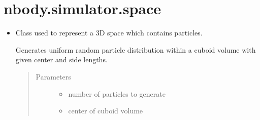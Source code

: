 \documentclass[letterpaper,10pt,english]{sphinxmanual}
\begin{document}
\section{nbody.simulator.space}
\label{\detokenize{space:nbody-simulator-space}}\label{\detokenize{space::doc}}\begin{itemize}
\item {} 

\begin{fulllineitems}
\label{\detokenize{space:nbody.simulator.space.Space}}
\sphinxAtStartPar
Class used to represent a 3D space which contains particles.

\begin{fulllineitems}
\label{\detokenize{space:nbody.simulator.space.Space.__init__}}
\end{fulllineitems}


\begin{fulllineitems}
\label{\detokenize{space:nbody.simulator.space.Space.add_cuboid}}
\sphinxAtStartPar
Generates uniform random particle distribution within a cuboid volume
with given center and side lengths.
\begin{quote}\begin{description}
\item[{Parameters}] \leavevmode\begin{itemize}
\item {} 
\sphinxAtStartPar
{} \textendash{} number of particles to generate

\item {} 
\sphinxAtStartPar
{} \textendash{} center of cuboid volume


\end{itemize}
\end{description}
\end{quote}
\end{fulllineitems}
\end{fulllineitems}
\end{itemize}
\end{document}
